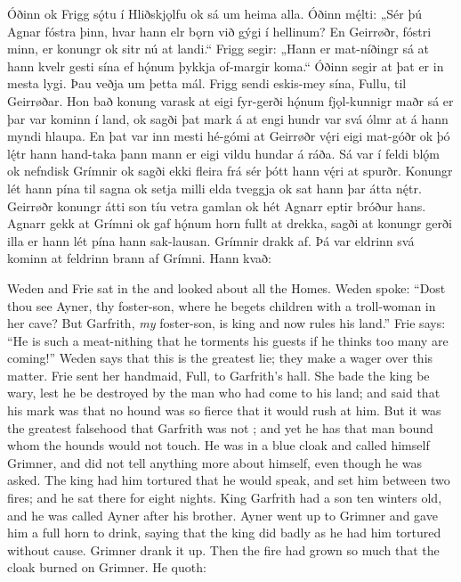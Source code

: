 \bpg\bpa{}%
Óðinn ok Frigg sǫ́tu í Hliðskjǫlfu ok sá um heima alla.
Óðinn mę́lti: „Sér þú Agnar fóstra þinn, hvar hann elr bǫrn við gýgi í hellinum?
En Geirrøðr, fóstri minn, er konungr ok sitr nú at landi.“
Frigg segir: „Hann er mat-níðingr sá at hann kvelr gesti sína ef hǫ́num þykkja of-margir koma.“
Óðinn segir at þat er in mesta lygi. Þau veðja um þetta mál.
Frigg sendi eskis-mey sína, Fullu, til Geirrøðar. Hon bað konung varask at eigi fyr-gerði hǫ́num fjǫl-kunnigr maðr sá er þar var kominn í land, ok sagði þat mark á at engi hundr var svá ólmr at á hann myndi hlaupa.
En þat var inn mesti hé-gómi at Geirrøðr vę́ri eigi mat-góðr ok þó lę́tr hann hand-taka þann mann er eigi vildu hundar á ráða.
Sá var í feldi blǫ́m ok nefndisk Grímnir ok sagði ekki fleira frá sér þótt hann vę́ri at spurðr.
Konungr lét hann pína til sagna ok setja milli elda tveggja ok sat hann þar átta nę́tr.
Geirrøðr konungr átti son tíu vetra gamlan ok hét Agnarr eptir bróður hans.
Agnarr gekk at Grímni ok gaf hǫ́num horn fullt at drekka, sagði at konungr gerði illa er hann lét pína hann sak-lausan.
Grímnir drakk af. Þá var eldrinn svá kominn at feldrinn brann af Grímni. Hann kvað:\epa

\bpb Weden and Frie sat in the  and looked about all the Homes.
Weden spoke: “Dost thou see Ayner, thy foster-son, where he begets children with a troll-woman in her cave?
But Garfrith, \emph{my} foster-son, is king and now rules his land.”
Frie says: “He is such a meat-nithing that he torments his guests if he thinks too many are coming!”
Weden says that this is the greatest lie; they make a wager over this matter.
Frie sent her handmaid, Full, to Garfrith’s hall. She bade the king be wary, lest he be destroyed by the  man who had come to his land; and said that his mark was that no hound was so fierce that it would rush at him.
But it was the greatest falsehood that Garfrith was not ; and yet he has that man bound whom the hounds would not touch.
He was in a blue cloak and called himself Grimner, and did not tell anything more about himself, even though he was asked.
The king had him tortured that he would speak, and set him between two fires; and he sat there for eight nights.
King Garfrith had a son ten winters old, and he was called Ayner after his brother.
Ayner went up to Grimner and gave him a full horn to drink, saying that the king did badly as he had him tortured without cause.
Grimner drank it up. Then the fire had grown so much that the cloak burned on Grimner. He quoth:\epb\epg{}

